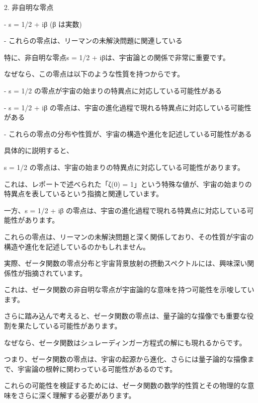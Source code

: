 2. 非自明な零点

   - s = 1/2 + iβ (β は実数)

   - これらの零点は、リーマンの未解決問題に関連している



特に、非自明な零点s = 1/2 + iβは、宇宙論との関係で非常に重要です。



なぜなら、この零点は以下のような性質を持つからです。



- s = 1/2 の零点が宇宙の始まりの特異点に対応している可能性がある

- s = 1/2 + iβ の零点は、宇宙の進化過程で現れる特異点に対応している可能性がある

- これらの零点の分布や性質が、宇宙の構造や進化を記述している可能性がある



具体的に説明すると、



s = 1/2 の零点は、宇宙の始まりの特異点に対応している可能性があります。

これは、レポートで述べられた「ζ(0) = 1」という特殊な値が、宇宙の始まりの特異点を表しているという指摘と関連しています。



一方、s = 1/2 + iβ の零点は、宇宙の進化過程で現れる特異点に対応している可能性があります。

これらの零点は、リーマンの未解決問題と深く関係しており、その性質が宇宙の構造や進化を記述しているのかもしれません。



実際、ゼータ関数の零点分布と宇宙背景放射の摂動スペクトルには、興味深い関係性が指摘されています。

これは、ゼータ関数の非自明な零点が宇宙論的な意味を持つ可能性を示唆しています。



さらに踏み込んで考えると、ゼータ関数の零点は、量子論的な描像でも重要な役割を果たしている可能性があります。

なぜなら、ゼータ関数はシュレーディンガー方程式の解にも現れるからです。



つまり、ゼータ関数の零点は、宇宙の起源から進化、さらには量子論的な描像まで、宇宙論の根幹に関わっている可能性があるのです。



これらの可能性を検証するためには、ゼータ関数の数学的性質とその物理的な意味をさらに深く理解する必要があります。

